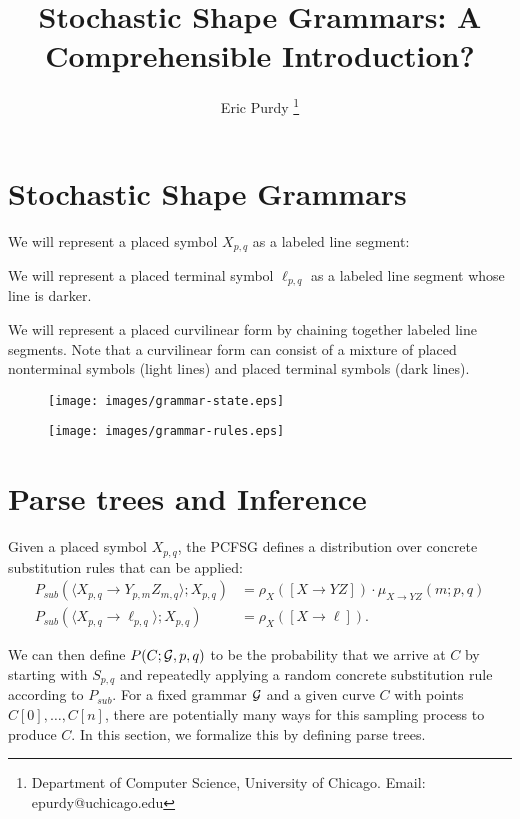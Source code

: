 \documentclass{article}
\title{Stochastic Shape Grammars: A Comprehensible Introduction?}
\author{Eric Purdy \footnote{Department of Computer Science, University of Chicago. Email: epurdy@uchicago.edu}}
\begin{document}
\maketitle

\section{Stochastic Shape Grammars}

We will represent a placed symbol $X_{p,q}$ as a labeled line segment:

We will represent a placed terminal symbol $\ell_{p,q}$ as a labeled
line segment whose line is darker.

We will represent a placed curvilinear form by chaining together
labeled line segments. Note that a curvilinear form can consist of a
mixture of placed nonterminal symbols (light lines) and placed
terminal symbols (dark lines).


\begin{figure}
\texttt{[image: images/grammar-state.eps]}
\end{figure}

\begin{figure}
\texttt{[image: images/grammar-rules.eps]}
\end{figure}

\section{Parse trees and Inference}

Given a placed symbol $X_{p,q}$, the PCFSG defines a distribution over
concrete substitution rules that can be applied:
\begin{align*}
  P_{sub}( \langle X_{p,q} \to Y_{p,m} Z_{m,q}\rangle ; X_{p,q})
  &= \rho_X([X\to YZ]) \cdot \mu_{X\to YZ}(m; p,q)\\
  P_{sub}( \langle X_{p,q} \to \ell_{p,q} \rangle ; X_{p,q}) 
  &= \rho_X([X\to \ell]).
\end{align*}

We can then define $P(C; {\mathcal G}, p,q)$ to be the probability that we
arrive at $C$ by starting with $S_{p,q}$ and repeatedly applying a
random concrete substitution rule according to $P_{sub}$. For a fixed
grammar ${\mathcal G}$ and a given curve $C$ with points $C[0], \dots, C[n]$,
there are potentially many ways for this sampling process to produce
$C$. In this section, we formalize this by defining parse trees.
\end{document}
